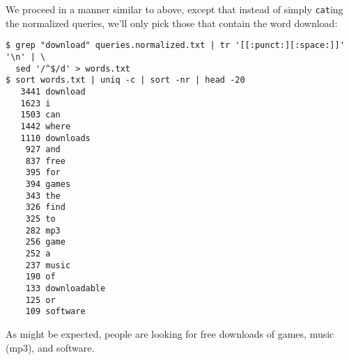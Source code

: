 \begin{itemize}
We proceed in a manner similar to above, except that instead of simply
\texttt{cat}ing the normalized queries, we'll only pick those that contain the
word download:

\begin{verbatim}
$ grep "download" queries.normalized.txt | tr '[[:punct:][:space:]]' '\n' | \
  sed '/^$/d' > words.txt
$ sort words.txt | uniq -c | sort -nr | head -20
   3441 download
   1623 i
   1503 can
   1442 where
   1110 downloads
    927 and
    837 free
    395 for
    394 games
    343 the
    326 find
    325 to
    282 mp3
    256 game
    252 a
    237 music
    190 of
    133 downloadable
    125 or
    109 software
\end{verbatim}

As might be expected, people are looking for free downloads of games, music
(mp3), and software.

\end{itemize}

